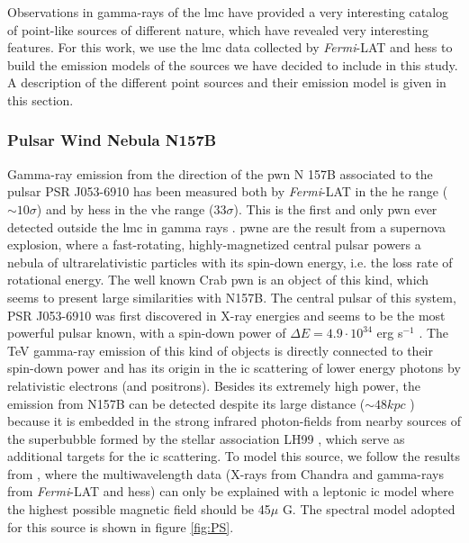 \documentclass[main.tex]{subfiles}
\begin{document}
Observations in gamma-rays of the \gls{lmc} have provided a very interesting catalog of point-like sources of different nature, which have revealed very interesting features. For this work, we use the \gls{lmc} data collected by \textit{Fermi}-LAT \cite{2010FermiLATLMC11months} \cite{2016LMCFermiLAT} and \gls{hess} \cite{2012HESSLMC} \cite{2015HESSTeVLMC} \cite{2017HESSLMCP3} to build the emission models of the sources we have decided to include in this study. A description of the different point sources and their emission model is given in this section.

\subsubsection{Pulsar Wind Nebula N157B}

Gamma-ray emission from the direction of the \gls{pwn} N 157B associated to the pulsar  PSR J053-6910 has been measured both by \textit{Fermi}-LAT in the \gls{he} range ($\sim 10 \sigma$) and by \gls{hess} in the \gls{vhe} range ($33 \sigma$). This is the first and only \gls{pwn} ever detected outside the \gls{lmc} in gamma rays \cite{2012HESSN157B}. \gls{pwne} are the result from  a supernova explosion, where a fast-rotating, highly-magnetized central pulsar powers a nebula of ultrarelativistic particles with its spin-down energy, i.e. the loss rate of rotational energy. The well known Crab \gls{pwn} is an object of this kind, which seems to present large similarities with N157B. The central pulsar of this system, PSR J053-6910 was first discovered in X-ray energies and seems to be the most powerful pulsar known, with a spin-down power of $\Delta E = 4.9 \cdot 10^{34} $ erg s$^{-1}$ \cite{1998PulsarN157B}. The TeV gamma-ray emission of this kind of objects is directly connected to their spin-down power and has its origin in the \gls{ic} scattering of lower energy photons by relativistic electrons (and positrons). Besides its extremely high power, the emission from N157B can be detected despite its large distance ($\sim 48 kpc$ \cite{2006N157Bdistance}) because it is embedded in the strong infrared photon-fields from nearby sources of the superbubble formed by the stellar association LH99 \cite{}, which serve as additional targets for the \gls{ic} scattering.
To model this source, we follow the results from \cite{2015HESSTeVLMC}, where the multiwavelength data (X-rays from Chandra \cite{2001ChandraN157B} and gamma-rays from \textit{Fermi}-LAT and \gls{hess}) can only be explained with a leptonic \gls{ic} model where the highest possible magnetic field should be 45$\mu$ G. The  spectral model adopted for this source is shown in figure \ref{fig:PS}.
\end{document}
